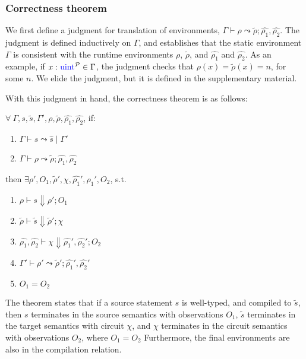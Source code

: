 \subsubsection*{Correctness theorem} We first define a judgment for
translation of environments, $\Gamma \vdash \rho \leadsto
\widetilde{\rho}; \widehat{\rho_{1}}, \widehat{\rho_{2}}$. The
judgment is defined inductively on $\Gamma$, and establishes that
the static environment $\Gamma$ is consistent with the runtime
environments $\rho$, $\widetilde{\rho}$, and $\widehat{\rho_{1}}$ and
$\widehat{\rho_{2}}$. As an example, if $x:\kw{uint}^{\mathcal{P}} \in
\Gamma$, the judgment checks that $\rho(x) = \widetilde{\rho}(x) =
n$, for some $n$. We elide the judgment, but it is defined in the
supplementary material.

With this judgment in hand, the correctness theorem is as follows:

\begin{theorem}[Correctness]\label{theorem:correctness}
  $\forall\:\Gamma, s, \widetilde{s}, \Gamma', \rho, \widetilde{\rho}, \widehat{\rho_{1}}, \widehat{\rho_{2}}$, if:

  \begin{enumerate}
  \item $\Gamma \vdash s \leadsto \widehat{s} \mid \Gamma'$
  \item $\Gamma \vdash \rho \leadsto \widetilde{\rho}; \widehat{\rho_{1}}, \widehat{\rho_{2}}$
  \end{enumerate}

  then $\exists \rho', O_{1}, \widetilde{\rho}', \chi, \widehat{\rho_{1}}', \widehat{\rho_{1}}', O_{2}$, s.t.

  \begin{enumerate}
  \item $\rho \vdash s \Downarrow \rho'; O_{1}$
  \item $\widetilde{\rho} \vdash \widetilde{s} \Downarrow \widetilde{\rho}'; \chi$
  \item $\widehat{\rho_{1}}, \widehat{\rho_{2}} \vdash \chi \Downarrow \widehat{\rho_{1}}', \widehat{\rho_{2}}'; O_{2}$
  \item $\Gamma' \vdash \rho' \leadsto \widetilde{\rho}'; \widehat{\rho_{1}}', \widehat{\rho_{2}}'$
  \item $O_{1} = O_{2}$
  \end{enumerate}
  
\end{theorem}

The theorem states that if a source statement $s$ is well-typed, and
compiled to $\widetilde{s}$, then $s$ terminates in the source
semantics with observations $O_{1}$, $\widetilde{s}$ terminates in the
target semantics with circuit $\chi$, and $\chi$ terminates in the
circuit semantics with observations $O_{2}$, where $O_{1} = O_{2}$
Furthermore, the final environments are also in the compilation
relation.

